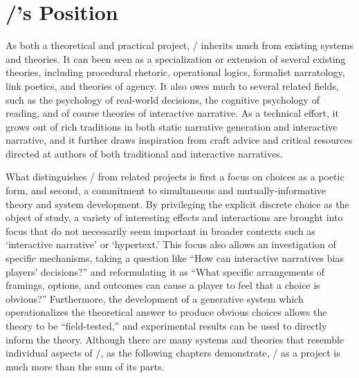 




\section{\dunyazad/'s Position}

As both a theoretical and practical project, \dunyazad/ inherits much from existing systems and theories.
%
It can been seen as a specialization or extension of several existing theories, including procedural rhetoric, operational logics, formalist narratology, link poetics, and theories of agency.
%
It also owes much to several related fields, such as the psychology of real-world decisions, the cognitive psychology of reading, and of course theories of interactive narrative.
%
As a technical effort, it grows out of rich traditions in both static narrative generation and interactive narrative, and it further draws inspiration from craft advice and critical resources directed at authors of both traditional and interactive narratives.


What distinguishes \dunyazad/ from related projects is first a focus on choices as a poetic form, and second, a commitment to simultaneous and mutually-informative theory and system development.
%
By privileging the explicit discrete choice as the object of study, a variety of interesting effects and interactions are brought into focus that do not necessarily seem important in broader contexts such as `interactive narrative' or `hypertext.'
%
This focus also allows an investigation of specific mechanisms, taking a question like ``How can interactive narratives bias players' decisions?'' and reformulating it as ``What specific arrangements of framings, options, and outcomes can cause a player to feel that a choice is obvious?''
%
Furthermore, the development of a generative system which operationalizes the theoretical answer to produce obvious choices allows the theory to be ``field-tested,'' and experimental results can be used to directly inform the theory.
%
Although there are many systems and theories that resemble individual aspects of \dunyazad/, as the following chapters demonstrate, \dunyazad/ as a project is much more than the sum of its parts.
